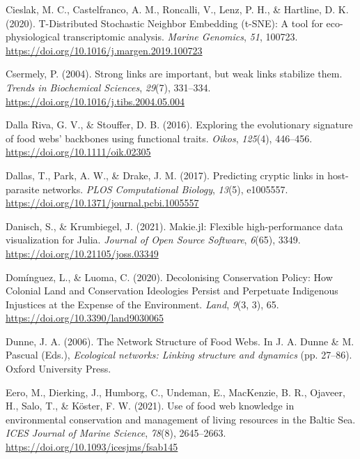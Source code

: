 \documentclass[11pt]{article}
\newlength{\cslhangindent}
\newenvironment{CSLReferences}[2] %
 {%
  \setlength{\parindent}{0pt}
  \ifodd #1 \everypar{\setlength{\hangindent}{\cslhangindent}}\ignorespaces\fi
  \ifnum #2 > 0
  \setlength{\parskip}{#2\baselineskip}
  \fi
 }%
 {}
\begin{document}
\begin{CSLReferences}{1}{0}
\leavevmode{}%
Cieslak, M. C., Castelfranco, A. M., Roncalli, V., Lenz, P. H., \&
Hartline, D. K. (2020). T-Distributed Stochastic Neighbor Embedding
(t-SNE): A tool for eco-physiological transcriptomic analysis.
\emph{Marine Genomics}, \emph{51}, 100723.
\url{https://doi.org/10.1016/j.margen.2019.100723}

\leavevmode{}%
Csermely, P. (2004). Strong links are important, but weak links
stabilize them. \emph{Trends in Biochemical Sciences}, \emph{29}(7),
331--334. \url{https://doi.org/10.1016/j.tibs.2004.05.004}

\leavevmode{}%
Dalla Riva, G. V., \& Stouffer, D. B. (2016). Exploring the evolutionary
signature of food webs' backbones using functional traits. \emph{Oikos},
\emph{125}(4), 446--456. \url{https://doi.org/10.1111/oik.02305}

\leavevmode{}%
Dallas, T., Park, A. W., \& Drake, J. M. (2017). Predicting cryptic
links in host-parasite networks. \emph{PLOS Computational Biology},
\emph{13}(5), e1005557.
\url{https://doi.org/10.1371/journal.pcbi.1005557}

\leavevmode{}%
Danisch, S., \& Krumbiegel, J. (2021). Makie.jl: Flexible
high-performance data visualization for Julia. \emph{Journal of Open
Source Software}, \emph{6}(65), 3349.
\url{https://doi.org/10.21105/joss.03349}

\leavevmode{}%
Domínguez, L., \& Luoma, C. (2020). Decolonising Conservation Policy:
How Colonial Land and Conservation Ideologies Persist and Perpetuate
Indigenous Injustices at the Expense of the Environment. \emph{Land},
\emph{9}(3, 3), 65. \url{https://doi.org/10.3390/land9030065}

\leavevmode{}%
Dunne, J. A. (2006). The Network Structure of Food Webs. In J. A. Dunne
\& M. Pascual (Eds.), \emph{Ecological networks: Linking structure and
dynamics} (pp. 27--86). Oxford University Press.

\leavevmode{}%
Eero, M., Dierking, J., Humborg, C., Undeman, E., MacKenzie, B. R.,
Ojaveer, H., Salo, T., \& Köster, F. W. (2021). Use of food web
knowledge in environmental conservation and management of living
resources in the Baltic Sea. \emph{ICES Journal of Marine Science},
\emph{78}(8), 2645--2663. \url{https://doi.org/10.1093/icesjms/fsab145}


\end{CSLReferences}
\end{document}
